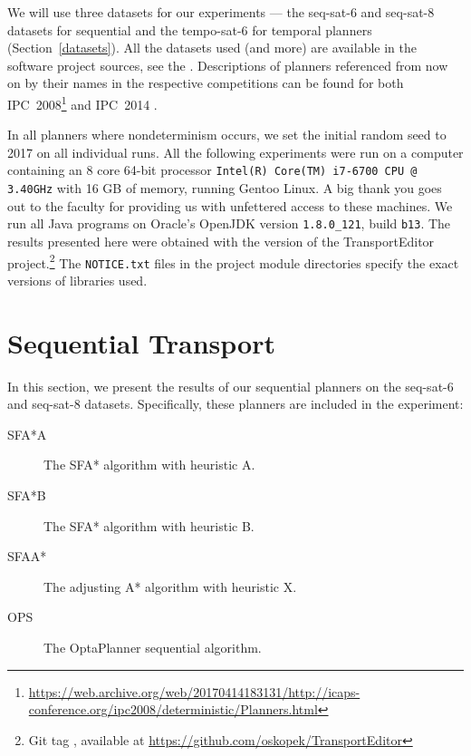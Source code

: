 We will use three datasets for our experiments --- the seq-sat-6
and seq-sat-8 datasets for sequential
and the tempo-sat-6 for temporal planners (Section~\ref{datasets}).
All the datasets used (and more) are available in the
software project sources, see the .
Descriptions of planners referenced from now on by their names in the respective competitions can be found for both IPC~2008\footnote{\url{https://web.archive.org/web/20170414183131/http://icaps-conference.org/ipc2008/deterministic/Planners.html}} and IPC~2014 \citep{Vallati2015}.

In all planners where nondeterminism occurs,
we set the initial random seed to 2017
on all individual runs.
All the following experiments
were run on a computer
containing an 8 core 64-bit processor \texttt{Intel(R) Core(TM) i7-6700 CPU @ 3.40GHz}
with 16 GB of memory, running Gentoo Linux.
A big thank you goes out to the faculty for providing us with unfettered access to these machines.
We run all Java programs on Oracle's OpenJDK 
version \texttt{1.8.0\_121}, build \texttt{b13}.
The results presented here were obtained with the \TEver{} version of the TransportEditor project.\footnote{Git tag \TEtag{}, available at \url{https://github.com/oskopek/TransportEditor}} The \texttt{NOTICE.txt} files
in the project module directories specify
the exact versions of libraries used.



















\section{Sequential Transport}

In this section, we present the results of our sequential planners on the seq-sat-6 and seq-sat-8 datasets. Specifically, these planners are included in the experiment:
\begin{description}
\item[SFA*A] The SFA* algorithm with heuristic A. 
\item[SFA*B] The SFA* algorithm with heuristic B. 
\item[SFAA*] The adjusting A* algorithm with heuristic X. 
\item[OPS] The OptaPlanner sequential algorithm. 
\end{description}

